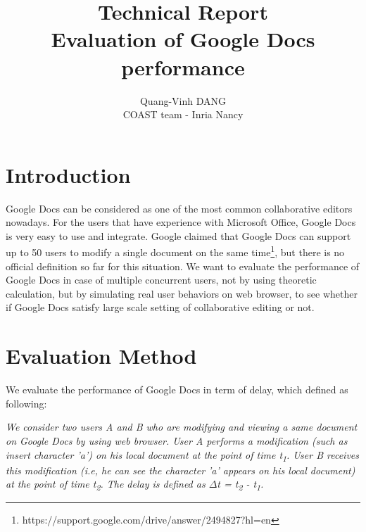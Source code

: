 \documentclass[a4paper,12pt]{article}
\begin{document}
	\author{Quang-Vinh DANG\\
COAST team - Inria Nancy}
	\title{Technical Report\\ Evaluation of Google Docs performance}\maketitle

\section{Introduction}

Google Docs can be considered as one of the most common collaborative editors nowadays. For the users that have experience with Microsoft Office, Google Docs is very easy to use and integrate.
Google claimed that Google Docs can support up to 50 users to modify a single document on the same time\footnote{ https://support.google.com/drive/answer/2494827?hl=en}, but there is no official definition so far for this situation.
We want to evaluate the performance of Google Docs in case of multiple concurrent users, not by using theoretic calculation, but by simulating real user behaviors on web browser, to see whether if Google Docs satisfy large scale setting of collaborative editing or not.

\section{Evaluation Method}
We evaluate the performance of Google Docs in term of delay, which defined as following:

\textit{We consider two users A and B who are modifying and viewing a same document on Google Docs by using web browser. User A performs a modification (such as insert character 'a') on his local document at the point of time t\textsubscript{1}. User B receives this modification (i.e, he can see the character 'a' appears on his local document) at the point of time t\textsubscript{2}. The delay is defined as $\Delta$t = t\textsubscript{2} - t\textsubscript{1}.}
\end{document}
